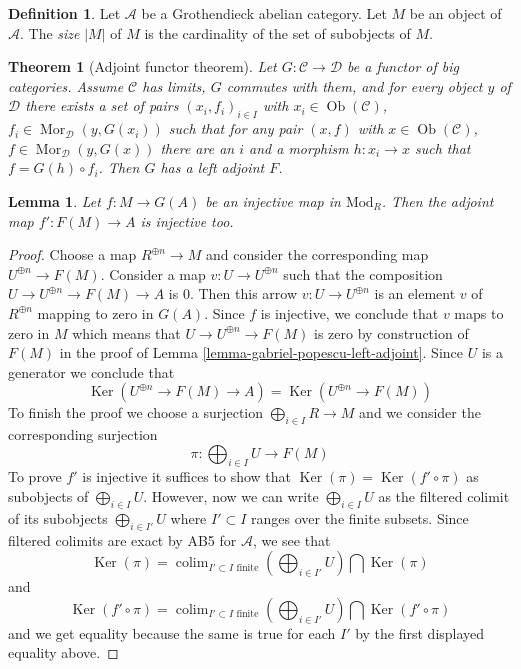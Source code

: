 \documentclass{amsart}
\theoremstyle{plain}
\newtheorem{theorem}[subsection]{Theorem}
\newtheorem{lemma}[subsection]{Lemma}
\theoremstyle{definition}
\newtheorem{definition}[subsection]{Definition}
\theoremstyle{remark}
\numberwithin{equation}{subsection}
\def\colim{\mathop{\mathrm{colim}}\nolimits}
\def\Mor{\mathop{\mathrm{Mor}}\nolimits}
\def\Ob{\mathop{\mathrm{Ob}}\nolimits}
\def\Ker{\mathop{\mathrm{Ker}}}
\begin{document}
\begin{definition}
\label{definition-size}
Let $\mathcal{A}$ be a Grothendieck abelian category.
Let $M$ be an object of $\mathcal{A}$.
The {\it size} $|M|$ of $M$ is the cardinality of the set of subobjects
of $M$.
\end{definition}

\begin{theorem}[Adjoint functor theorem]
\label{categories-theorem-adjoint-functor}
Let $G : \mathcal{C} \to \mathcal{D}$ be a functor of big categories.
Assume $\mathcal{C}$ has limits, $G$ commutes with them, and for
every object $y$ of $\mathcal{D}$ there exists a set of pairs
$(x_i, f_i)_{i \in I}$ with $x_i \in \Ob(\mathcal{C})$,
$f_i \in \Mor_\mathcal{D}(y, G(x_i))$ such that for any
pair $(x, f)$ with $x \in \Ob(\mathcal{C})$,
$f \in \Mor_\mathcal{D}(y, G(x))$ there are an $i$ and a morphism
$h : x_i \to x$ such that $f = G(h) \circ f_i$.
Then $G$ has a left adjoint $F$.
\end{theorem}

\begin{lemma}
\label{lemma-F-G-monos}
Let $f : M \to G(A)$ be an injective map in $\text{Mod}_R$.
Then the adjoint map $f' : F(M) \to A$ is injective too.
\end{lemma}

\begin{proof}
Choose a map $R^{\oplus n} \to M$ and consider the corresponding map
$U^{\oplus n} \to F(M)$. Consider a map $v : U \to U^{\oplus n}$
such that the composition $U \to U^{\oplus n} \to F(M) \to A$ is $0$.
Then this arrow $v : U \to U^{\oplus n}$ is an element
$v$ of $R^{\oplus n}$ mapping to zero in $G(A)$. Since $f$ is injective,
we conclude that $v$ maps to zero in $M$ which means that
$U \to U^{\oplus n} \to F(M)$ is zero by construction of $F(M)$
in the proof of Lemma \ref{lemma-gabriel-popescu-left-adjoint}.
Since $U$ is a generator we conclude that
$$
\Ker(U^{\oplus n} \to F(M) \to A) = \Ker(U^{\oplus n} \to F(M))
$$
To finish the proof we choose a surjection $\bigoplus_{i \in I} R \to M$
and we consider the corresponding surjection
$$
\pi : \bigoplus\nolimits_{i \in I} U \longrightarrow F(M)
$$
To prove $f'$ is injective it suffices to show that
$\Ker(\pi) = \Ker(f' \circ \pi)$ as subobjects of $\bigoplus_{i \in I} U$.
However, now we can write $\bigoplus_{i \in I} U$ as the filtered colimit
of its subobjects $\bigoplus_{i \in I'} U$ where $I' \subset I$
ranges over the finite subsets. Since filtered colimits are
exact by AB5 for $\mathcal{A}$, we see that
$$
\Ker(\pi) =
\colim_{I' \subset I\text{ finite}}
\left(\bigoplus\nolimits_{i \in I'} U\right)
\bigcap \Ker(\pi)
$$
and
$$
\Ker(f' \circ \pi) =
\colim_{I' \subset I\text{ finite}}
\left(\bigoplus\nolimits_{i \in I'} U\right)
\bigcap \Ker(f' \circ \pi)
$$
and we get equality because the same is true for each $I'$ by
the first displayed equality above.
\end{proof}
\end{document}
